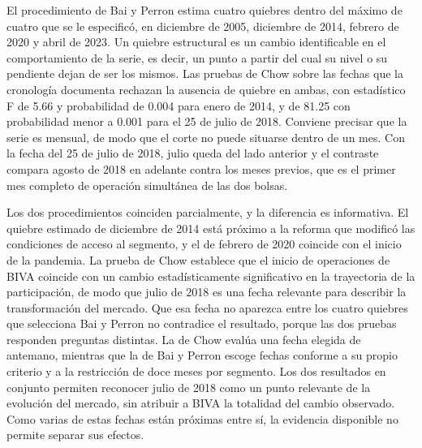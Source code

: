 El procedimiento de Bai y Perron estima cuatro quiebres dentro del máximo de cuatro que se le especificó, en diciembre de 2005, diciembre de 2014, febrero de 2020 y abril de 2023. Un quiebre estructural es un cambio identificable en el comportamiento de la serie, es decir, un punto a partir del cual su nivel o su pendiente dejan de ser los mismos. Las pruebas de Chow sobre las fechas que la cronología documenta rechazan la ausencia de quiebre en ambas, con estadístico F de 5.66 y probabilidad de 0.004 para enero de 2014, y de 81.25 con probabilidad menor a 0.001 para el 25 de julio de 2018. Conviene precisar que la serie es mensual, de modo que el corte no puede situarse dentro de un mes. Con la fecha del 25 de julio de 2018, julio queda del lado anterior y el contraste compara agosto de 2018 en adelante contra los meses previos, que es el primer mes completo de operación simultánea de las dos bolsas.

Los dos procedimientos coinciden parcialmente, y la diferencia es informativa. El quiebre estimado de diciembre de 2014 está próximo a la reforma que modificó las condiciones de acceso al segmento, y el de febrero de 2020 coincide con el inicio de la pandemia. La prueba de Chow establece que el inicio de operaciones de BIVA coincide con un cambio estadísticamente significativo en la trayectoria de la participación, de modo que julio de 2018 es una fecha relevante para describir la transformación del mercado. Que esa fecha no aparezca entre los cuatro quiebres que selecciona Bai y Perron no contradice el resultado, porque las dos pruebas responden preguntas distintas. La de Chow evalúa una fecha elegida de antemano, mientras que la de Bai y Perron escoge fechas conforme a su propio criterio y a la restricción de doce meses por segmento. Los dos resultados en conjunto permiten reconocer julio de 2018 como un punto relevante de la evolución del mercado, sin atribuir a BIVA la totalidad del cambio observado. Como varias de estas fechas están próximas entre sí, la evidencia disponible no permite separar sus efectos.



